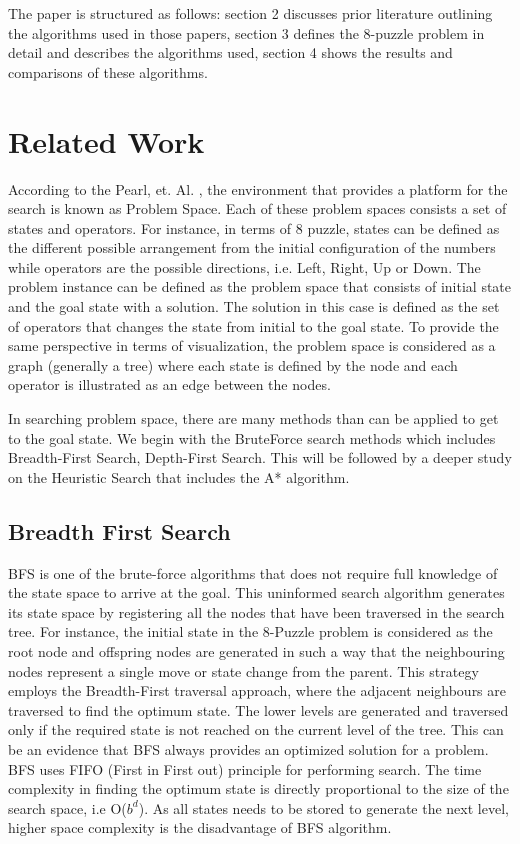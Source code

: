 \documentclass{svproc}
\begin{document}
\noindent The paper is structured as follows: section 2 discusses prior literature outlining the algorithms used in those papers,  section 3 defines the 8-puzzle problem in detail and describes the algorithms used, section 4 shows the results and comparisons of these algorithms.

\section{Related Work}

According to the Pearl, et. Al. , the environment that provides a platform for the search is known as Problem Space. Each of these problem spaces consists a set of states and operators. For instance, in terms of 8 puzzle, states can be defined as the different possible arrangement from the initial configuration of the numbers while operators are the possible directions, i.e. Left, Right, Up or Down. The problem instance can be defined as the problem space that consists of initial state and the goal state with a solution. The solution in this case is defined as the set of operators that changes the state from initial to the goal state. To provide the same perspective in terms of visualization, the problem space is considered as a graph (generally a tree) where each state is defined by the node and each operator is illustrated as an edge between the nodes.

In searching problem space, there are many methods than can be applied to get to the goal state. We begin with the BruteForce search methods which includes Breadth-First Search, Depth-First Search. This will be followed by a deeper study on the Heuristic Search that includes the A* algorithm.

\subsection{Breadth First Search}
BFS is one of the brute-force algorithms that does not require full knowledge of the state space to arrive at the goal. This uninformed search algorithm generates its state space by registering all the nodes that have been traversed in the search tree. For instance, the initial state in the 8-Puzzle problem is considered as the root node and offspring nodes are generated in such a way that the neighbouring nodes represent a single move or state change from the parent. This strategy employs the Breadth-First traversal approach, where the adjacent neighbours are traversed to find the optimum state. The lower levels are generated and traversed only if the required state is not reached on the current level of the tree. This can be an evidence that BFS always provides an optimized solution for a problem. BFS uses FIFO (First in First out) principle for performing search. The time complexity in finding the optimum state is directly proportional to the size of the search space, i.e O($b^{d}$). As all states needs to be stored to generate the next level, higher space complexity is the disadvantage of BFS algorithm.
\end{document}

